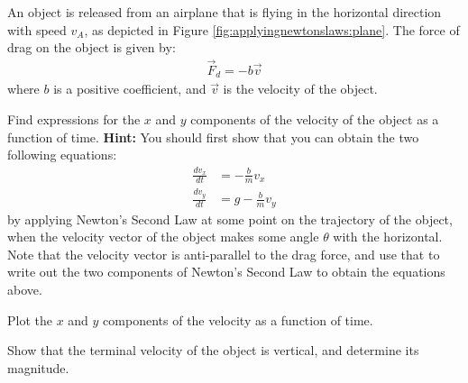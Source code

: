 \question An object is released from an airplane that is flying in the horizontal direction with speed $v_A$, as depicted in Figure \ref{fig:applyingnewtonslaws:plane}. The force of drag on the object is given by:
\begin{align*}
\vec F_d = -b\vec v
\end{align*}
where $b$ is a positive coefficient, and $\vec v$ is the velocity of the object. 
\begin{parts}
\item Find expressions for the $x$ and $y$ components of the velocity of the object as a function of time. \textbf{Hint:} You should first show that you can obtain the two following equations:
\begin{align*}
\frac{dv_x}{dt} &=-\frac{b}{m}v_x\\
\frac{dv_y}{dt} &= g-\frac{b}{m}v_y
\end{align*}
by applying Newton's Second Law at some point on the trajectory of the object, when the velocity vector of the object makes some angle $\theta$ with the horizontal. Note that the velocity vector is anti-parallel to the drag force, and use that to write out the two components of Newton's Second Law to obtain the equations above. 
\item Plot the $x$ and $y$ components of the velocity as a function of time. 
\item Show that the terminal velocity of the object is vertical, and determine its magnitude.
\end{parts}

